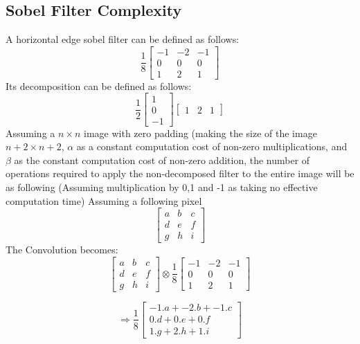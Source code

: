 \documentclass[a4paper,11pt]{article}
\begin{document}
\subsection{Sobel Filter Complexity}
A horizontal edge sobel filter can be defined as follows:
\[
\frac{1}{8}
\begin{bmatrix}
     -1&-2&-1\\
     0&0&0\\
     1&2&1
\end{bmatrix}
\]
\newline
Its decomposition can be defined as follows:
\[
\frac{1}{2}
\begin{bmatrix}
    1\\0\\-1
\end{bmatrix}
\begin{bmatrix}
    1&2&1
\end{bmatrix}
\]
\newline
Assuming a $n \times n$ image with zero padding (making the size of the image $n+2 \times n+2$, $\alpha$ as a constant computation cost of non-zero multiplications, and $\beta$ as the constant computation cost of non-zero addition, the number of operations required to apply the non-decomposed filter to the entire image will be as following (Assuming multiplication by 0,1 and -1 as taking no effective computation time)
\newline
Assuming a following pixel
\[
\begin{bmatrix}
     a&b&c\\
     d&e&f\\
     g&h&i
\end{bmatrix}
\]
\newline
The Convolution becomes:
\[
\begin{bmatrix}
     a&b&c\\
     d&e&f\\
     g&h&i
\end{bmatrix}
 \otimes \frac{1}{8}\begin{bmatrix}
     -1&-2&-1\\
     0&0&0\\
     1&2&1
\end{bmatrix}
\]

\[
\Rightarrow \frac{1}{8}\begin{bmatrix}
     -1.a+-2.b+-1.c\\
     0.d+0.e+0.f\\
     1.g+2.h+1.i
\end{bmatrix}
\]
\end{document}
